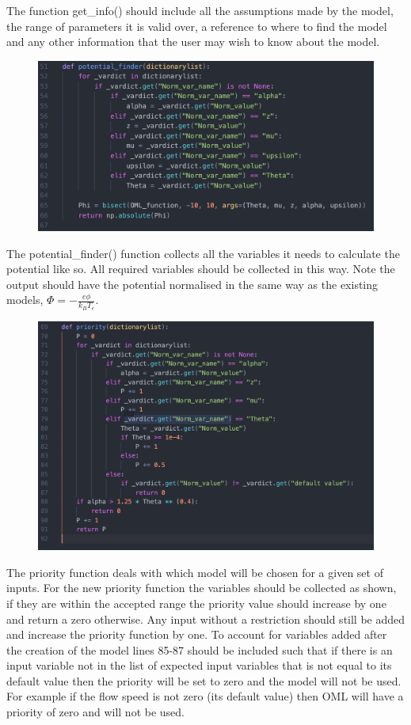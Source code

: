 \documentclass{journal}
\begin{document}
The function get\_info() should include all the assumptions 
made by the model, the range of parameters it is valid 
over, a reference to where to find the model and any other 
information that the user may wish to know about the model.

\begin{figure}[H]
\centering
\includegraphics[width=\linewidth]{Output/code6.jpeg}
\label{code6} 
\end{figure}

The potential\_finder() function collects all the variables it needs 
to calculate the potential like so. All required variables should be 
collected in this way. Note the output should have the potential normalised 
in the same way as the existing models, $\Phi = -\frac{e\phi}{k_B T_e}$.

\begin{figure}[H]
\centering
\includegraphics[width=\linewidth]{Output/code7.jpeg}
\label{code7} 
\end{figure}

The priority function deals with which model will be chosen for a 
given set of inputs. For the new priority function the variables should be 
collected as shown, if they are within the accepted range the priority value 
should increase by one and return a zero otherwise. Any input without a restriction 
should still be added and increase the priority function by one. To account for variables 
added after the creation of the model lines 85-87 should be included such that if there is 
an input variable not in the list of expected input variables that is not equal to its default 
value then the priority will be set to zero and the model will not be used. For example if the 
flow speed is not zero (its default value) then OML will have a priority of zero and will not be 
used. 
\end{document}
